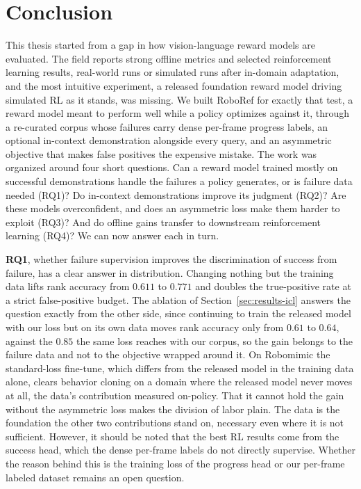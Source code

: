 \chapter{Conclusion}
\label{sec:conclusion}

This thesis started from a gap in how vision-language reward models are evaluated. The field reports strong offline metrics and selected reinforcement learning results, real-world runs or simulated runs after in-domain adaptation, and the most intuitive experiment, a released foundation reward model driving simulated RL as it stands, was missing. We built RoboRef for exactly that test, a reward model meant to perform well while a policy optimizes against it, through a re-curated corpus whose failures carry dense per-frame progress labels, an optional in-context demonstration alongside every query, and an asymmetric objective that makes false positives the expensive mistake. The work was organized around four short questions. Can a reward model trained mostly on successful demonstrations handle the failures a policy generates, or is failure data needed (RQ1)? Do in-context demonstrations improve its judgment (RQ2)? Are these models overconfident, and does an asymmetric loss make them harder to exploit (RQ3)? And do offline gains transfer to downstream reinforcement learning (RQ4)? We can now answer each in turn.

\textbf{RQ1}, whether failure supervision improves the discrimination of success from failure, has a clear answer in distribution. Changing nothing but the training data lifts rank accuracy from $0.611$ to $0.771$ and doubles the true-positive rate at a strict false-positive budget. The ablation of Section~\ref{sec:results-icl} answers the question exactly from the other side, since continuing to train the released model with our loss but on its own data moves rank accuracy only from $0.61$ to $0.64$, against the $0.85$ the same loss reaches with our corpus, so the gain belongs to the failure data and not to the objective wrapped around it. On Robomimic the standard-loss fine-tune, which differs from the released model in the training data alone, clears behavior cloning on a domain where the released model never moves at all, the data's contribution measured on-policy. That it cannot hold the gain without the asymmetric loss makes the division of labor plain. The data is the foundation the other two contributions stand on, necessary even where it is not sufficient. However, it should be noted that the best RL results come from the success head, which the dense per-frame labels do not directly supervise. Whether the reason behind this is the training loss of the progress head or our per-frame labeled dataset remains an open question.

